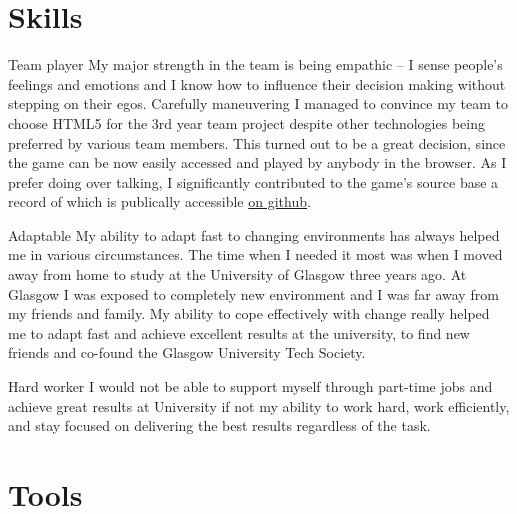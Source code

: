\documentclass{tccv}
\begin{document}
\section{Skills}

\begin{skillist}
\item{Team player} {My major strength in the team is being empathic -- I sense people's feelings and emotions and I know how to influence their decision making without stepping on their egos. Carefully maneuvering I managed to convince my team to choose HTML5 for the 3rd year team project despite other technologies being preferred by various team members. This turned out to be a great decision, since the game can be now easily accessed and played by anybody in the browser. As I prefer doing over talking, I significantly contributed to the game's source base a record of which is publically accessible \href{https://github.com/ivababukova/TP3-Security-game}{on github}.}

\item{Adaptable} {My ability to adapt fast to changing environments has always helped me in various circumstances. The time when I needed it most was when I moved away from home to study at the University of Glasgow three years ago. At Glasgow I was exposed to completely new environment and I was far away from my friends and family. My ability to cope effectively with change really helped me to adapt fast and achieve excellent results at the university, to find new friends and co-found the Glasgow University Tech Society.}

\item{Hard worker} {I would not be able to support myself through part-time jobs and achieve great results at University if not my ability to work hard, work efficiently, and stay focused on delivering the best results regardless of the task.}

\end{skillist}
\newpage
\section{Tools}
\end{document}
